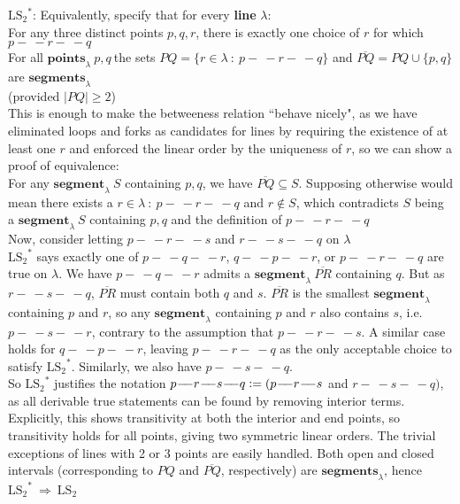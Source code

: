 \documentclass{article}
\newcommand{\hcm}[1][1]{\hspace{#1 cm}}
\newcommand{\nl}[1][12]{\\[#1pt]}
\newcommand{\imp}{\ \Rightarrow\ }
\newcommand{\st}{\ : \ }
\newcommand{\defeq}{\vcentcolon=}
\newcommand{\ch}[1]{\text{#1}}
\newcommand {\chb}[1]{\textbf{#1}}
\newcommand{\seg}{\!-\!\!\!\!\:-}
\begin{document}
\begin{flushleft}
{\color{purple}
	${\ch{LS}_2}^*$: Equivalently, specify that for every \chb{line} $\lambda$:\\
	
	\hcm[2]For any three distinct points $p,q,r$, there is exactly one choice of $r$ for which $p\seg r \seg q$\\
	
	\hcm[2]For all $\chb{points}_\lambda\ p,q\ $the sets $PQ = \{r \in \lambda \st p\seg r \seg q\}$ and $\overline{PQ} = PQ\cup \{p,q\}$ are $\chb{segments}_\lambda$\\\hcm[2](provided $|PQ|\geq2$)\nl[5]
	
	\hcm This is enough to make the betweeness relation ``behave nicely", as we have eliminated loops and forks as candidates for lines by requiring the existence of at least one $r$ and enforced the linear order by the uniqueness of $r$, so we can show a proof of equivalence:\nl[5]
	
	\hcm For any $\chb{segment}_\lambda\ S$ containing $p, q$, we have $\overline{PQ} \subseteq S$. Supposing otherwise would mean there exists a $r \in \lambda \st p\seg r \seg q$ and $r \notin S$, which contradicts $S$ being a $\chb{segment}_\lambda\ S$ containing $p, q$ and the definition of $p\seg r \seg q$\nl[5]
	 
	\hcm Now, consider letting $p \seg r \seg s$ and $r\seg s\seg q$ on $\lambda$\nl[5]
	\hcm${\ch{LS}_2}^*$ says exactly one of $p\seg q \seg r$, $q \seg p \seg r$, or $p \seg r \seg q$ are true on $\lambda$. We have $p \seg q \seg r$ admits a $\chb{segment}_\lambda\ \overline{PR}$ containing $q$. But as $r\seg s \seg q$, $\overline{PR}$ must contain both $q$ and $s$. $\overline{PR}$ is the smallest $\chb{segment}_\lambda$ containing $p$ and $r$, so any $\chb{segment}_\lambda$ containing $p$ and $r$ also contains $s$, i.e. $p\seg s \seg r$, contrary to the assumption that $p \seg r \seg s$. A similar case holds for $q \seg p \seg r$, leaving $p \seg r \seg q$ as the only acceptable choice to satisfy ${\ch{LS}_2}^*$. Similarly, we also have $p \seg s \seg q$.\nl[5]
	
	\hcm So ${\ch{LS}_2}^*$ justifies the notation $p \seg r \seg s \seg q \defeq (p \seg r \seg s$ and $r \seg s \seg q)$, as all derivable true statements can be found by removing interior terms. Explicitly, this shows transitivity at both the interior and end points, so transitivity holds for all points, giving two symmetric linear orders. The trivial exceptions of lines with 2 or 3 points are easily handled. Both open and closed intervals (corresponding to $PQ$ and $\overline{PQ}$, respectively) are $\chb{segments}_\lambda$, hence ${\ch{LS}_2}^* \imp \ch{LS}_2$\nl[5]
}
	

\end{flushleft}
\end{document}
